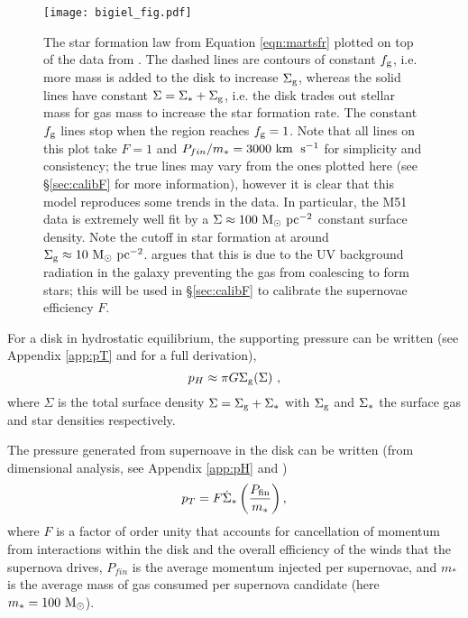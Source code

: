 \begin{figure}
    \centering
    \texttt{[image: bigiel\_fig.pdf]}
    \caption{The star formation law from Equation \ref{eqn:martsfr} plotted on top of the data from \citet{bigiel_star_2008}. The dashed lines are contours of constant $f_\mathrm{g}$, i.e. more mass is added to the disk to increase $\Sigma_\mathrm{g}$, whereas the solid lines have constant $\Sigma = \Sigma_* + \Sigma_\mathrm{g}$, i.e. the disk trades out stellar mass for gas mass to increase the star formation rate. The constant $f_\mathrm{g}$ lines stop when the region reaches $f_\mathrm{g}=1$. Note that all lines on this plot take $F=1$ and $P_{fin}/m_* = 3000 ~\mathrm{km}\;~\mathrm{s}^{-1}$ for simplicity and consistency; the true lines may vary from the ones plotted here (see \S \ref{sec:calibF} for more information), however it is clear that this model reproduces some trends in the data. In particular, the M51 data is extremely well fit by a $\Sigma \approx 100 ~\mathrm{M}_{\odot} ~\mathrm{pc}^{-2}$ constant surface density. Note the cutoff in star formation at around $\Sigma_\mathrm{g} \approx 10 ~\mathrm{M}_{\odot} ~\mathrm{pc}^{-2}$. \citet{schaye_star_2004} argues that this is due to the UV background radiation in the galaxy preventing the gas from coalescing to form stars; this will be used in \S \ref{sec:calibF} to calibrate the supernovae efficiency $F$.}
    \label{fig:bigielwithmart}
\end{figure}

For a disk in hydrostatic equilibrium, the supporting pressure can be written (see Appendix \ref{app:pT} and \citet{ostriker_maximally_2011} for a full derivation),
\begin{equation}
\label{eqn:hydeq}
p_H \approx \pi G \Sigma_\mathrm{g} (\Sigma)~,
\end{equation}
where $\Sigma$ is the total surface density $\Sigma = \Sigma_\mathrm{g} + \Sigma_*$ with $\Sigma_\mathrm{g}$ and $\Sigma_*$ the surface gas and star densities respectively.

The pressure generated from supernoave in the disk can be written (from dimensional analysis, see Appendix \ref{app:pH} and \citet{martizzi_supernova_2015})
\begin{equation}
\label{eqn:turb}
p_T = F \dot{\Sigma}_* \left(\frac{P_\mathrm{fin}}{m_*}\right),
\end{equation}
where $F$ is a factor of order unity that accounts for cancellation of momentum from interactions within the disk and the overall efficiency of the winds that the supernova drives, $P_{fin}$ is the average momentum injected per supernovae, and $m_*$ is the average mass of gas consumed per supernova candidate (here $m_* = 100 ~\mathrm{M}_{\odot}$).

